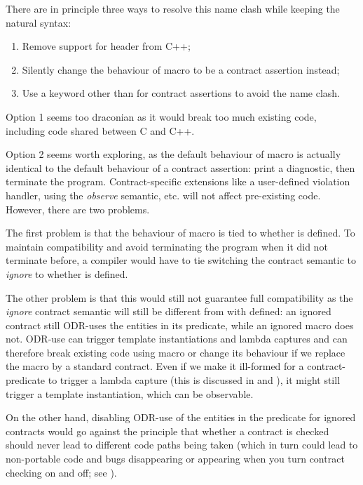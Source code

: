 There are in principle three ways to resolve this name clash while keeping the natural syntax:

\begin{enumerate}
\item Remove support for header  from C++;
\item Silently change the behaviour of macro  to be a contract assertion instead;
\item Use a keyword other than  for contract assertions to avoid the name clash.
\end{enumerate}

Option 1 seems too draconian as it would break too much existing code, including code shared between C and C++.

Option 2 seems worth exploring, as the default behaviour of macro  is actually identical to the default behaviour of a contract assertion: print a diagnostic, then terminate the program. Contract-specific extensions like a user-defined violation handler, using the \emph{observe} semantic, etc. will not affect pre-existing code. However, there are two problems.

The first problem is that the behaviour of macro  is tied to whether  is defined. To maintain compatibility and avoid terminating the program when it did not terminate before, a compiler would have to tie switching the contract semantic to \emph{ignore} to whether  is defined.

The other problem is that this would still not guarantee full compatibility as the \emph{ignore} contract semantic will still be different from  with  defined: an ignored contract still ODR-uses the entities in its predicate, while an ignored  macro does not. ODR-use can trigger template instantiations and lambda captures and can therefore break existing code using macro  or change its behaviour if we replace the macro by a standard contract. Even if we make it ill-formed for a contract-predicate to trigger a lambda capture (this is discussed in \cite{P2834R1} and \cite{P2890R0}), it might still trigger a template instantiation, which can be observable.

On the other hand, disabling ODR-use of the entities in the predicate for ignored contracts would go against the principle that whether a contract is checked should never lead to different code paths being taken (which in turn could lead to non-portable code and bugs disappearing or appearing when you turn contract checking on and off; see \cite{P2834R1}).

